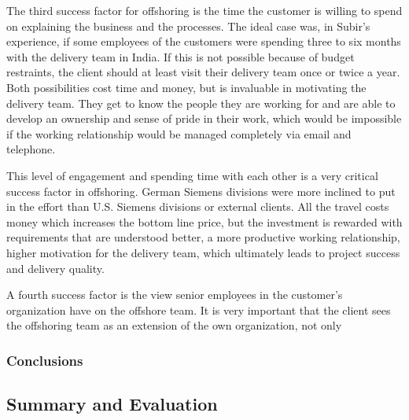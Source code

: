 The third success factor for offshoring is the time the customer is willing to spend on explaining the business and the processes. The ideal case was, in Subir's experience, if some employees of the customers were spending three to six months with the delivery team in India. If this is not possible because of budget restraints, the client should at least visit their delivery team once or twice a year. Both possibilities cost time and money, but is invaluable in motivating the delivery team. They get to know the people they are working for and are able to develop an ownership and sense of pride in their work, which would be impossible if the working relationship would be managed completely via email and telephone.

This level of engagement and spending time with each other is a very critical success factor in offshoring. German Siemens divisions were more inclined to put in the effort than U.S. Siemens divisions or external clients. All the travel costs money which increases the bottom line price, but the investment is rewarded with requirements that are understood better, a more productive working relationship, higher motivation for the delivery team, which ultimately leads to project success and delivery quality.

A fourth success factor is the view senior employees in the customer's organization have on the offshore team. It is very important that the client sees the offshoring team as an extension of the own organization, not only 

\subsubsection{Conclusions}


\subsection{Summary and Evaluation}






























